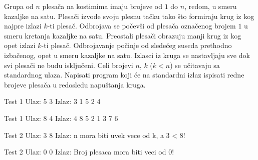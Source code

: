 \begin{Exercise}[label=612]
Grupa od $n$ plesača na kostimima imaju brojeve od $1$ do $n$, redom, u smeru kazaljke na satu.
Plesači izvode svoju plesnu tačku tako što formiraju krug iz kog najpre izlazi $k$-ti plesač.
Odbrojava se počevši od plesača označenog brojem $1$ u smeru kretanja kazaljke na satu. 
Preostali plesači obrazuju manji krug iz kog opet izlazi $k$-ti plesač. Odbrojavanje počinje od
sledećeg suseda prethodno izbačenog, opet u smeru kazaljke na satu. Izlasci iz kruga se nastavljaju
sve dok svi plesači ne budu isključeni. 
Celi brojevi $n$, $k$ ($k < n$) se učitavaju sa standardnog ulaza. 
Napisati program koji će na standardni izlaz ispisati redne brojeve plesača u redosledu napuštanja kruga. 

\begin{minitest}
\begin{test}{Test 1}
Ulaz: 
  5 3 
Izlaz: 
  3 1 5 2 4
\end{test}
\end{minitest}
\begin{minitest}
\begin{test}{Test 1}
Ulaz: 
  8 4 
Izlaz: 
  4 8 5 2 1 3 7 6 
\end{test}
\end{minitest}
\begin{minitest}
\begin{test}{Test 2}
Ulaz: 
  3 8 
Izlaz: 
  n mora biti uvek vece od k, a 3 < 8!
\end{test}
\end{minitest}
\begin{minitest}
\begin{test}{Test 2}
Ulaz: 
  0  0
Izlaz: 
  Broj plesaca mora biti veci od 0!
\end{test}
\end{minitest}
\end{Exercise}
\begin{Answer}[ref=612]
\end{Answer}

